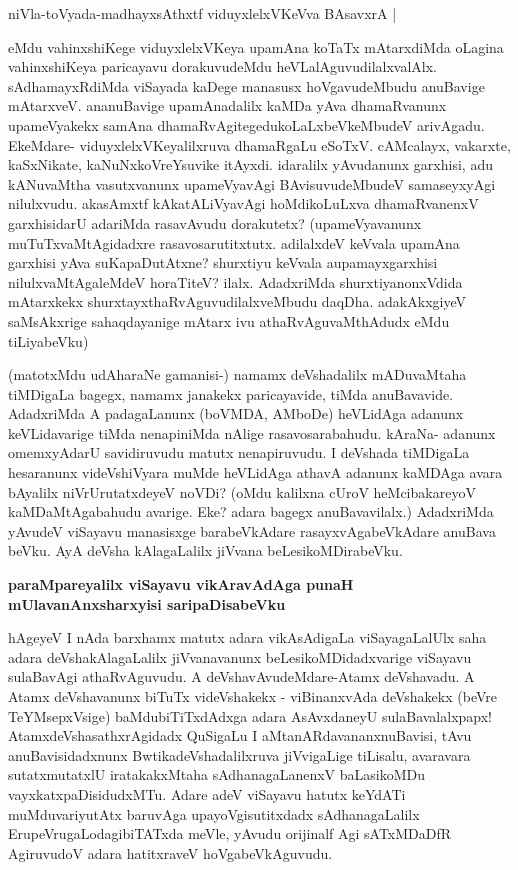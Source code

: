 \medskip
\begin{shloka}
niVla-toVyada-madhayxsAthxtf viduyxlelxVKeVva BAsavxrA |\label{166}
\end{shloka}
\smallskip

\noindent
eMdu vahinxshiKege viduyxlelxVKeya upamAna koTaTx mAtarxdiMda oLagina vahinx\break\-shiKeya paricayavu dorakuvudeMdu heVLalAguvudilalxvalAlx. sAdhamayxRdiMda viSayada kaDege manasusx hoVgavudeMbudu anuBavige mAtarxveV. ananu\-Bavige upamAnadalilx kaMDa yAva dhamaRvanunx upameVyakekx samAna dhamaRvAgi\break tegedu\-koLaLxbeVkeMbudeV arivAgadu. EkeMdare- viduyxlelxVKeyalilxruva dhamaR\-gaLu eSoTxV.\- cAMcalayx, vakarxte, kaSxNikate, kaNuNxkoVreYsuvike itAyxdi. idaralilx yAvu\-danunx garxhisi, adu kANuvaMtha vasutx\-vanunx upameVyavAgi BAvisuvudeMbudeV samaseyxyAgi nilulxvudu. akasAmxtf kAka\-tALiVya\-vAgi hoMdikoLuLxva dhamaRvanenxV garxhisidarU adariMda rasavAvudu dorakutetx? (upameVyavanunx muTuTx\-vaMtA\-gidadxre rasa\-vosarutitxtutx. adilalxdeV keVvala upamAna garxhisi yAva suKapaDutAtxne? shurxtiyu keVvala aupamayxgarxhisi nilulxvaMtAgaleMdeV horaTiteV? ilalx. AdadxriMda shurxtiyanonxVdida mAtarxkekx shurxtayxthaR\-vAguvudilalxveMbudu daqDha. adakAkxgiyeV saMsAkxrige sahaqdayanige mAtarx ivu athaRvAgu\-vaMthAdudx eMdu tiLiyabeVku)

\medskip

(matotxMdu udAharaNe gamanisi-) namamx deVshadalilx mADuvaMtaha tiMDigaLa bagegx, namamx janakekx paricayavide, tiMda anuBavavide. AdadxriMda A padagaLanunx (boVMDA, AMboDe) heVLidAga adanunx keVLidavarige tiMda nenapiniMda nAlige rasavosarabahudu. kAraNa- adanunx omemxyAdarU savidiru\-vudu matutx nenapiruvudu. I deVshada tiMDigaLa hesaranunx videVshiVyara muMde heVLidAga athavA adanunx kaMDAga avara bAyalilx niVrUrutatxdeyeV noVDi? (oMdu kalilxna cUroV heMcibakareyoV kaMDaMtAgabahudu avarige. Eke? adara bagegx anuBavavilalx.) AdadxriMda yAvudeV viSayavu mana\-sisxge barabeVkAdare rasayxvAgabeVkAdare anuBava beVku. AyA deVsha kAlagaLalilx jiVvana beLesikoMDirabeVku.

{\bigskip
\noindent
{\large\bf paraMpareyalilx viSayavu vikAravAdAga punaH mUlavanAnxsharxyisi saripaDisa\-beVku}}
\medskip

\noindent
hAgeyeV I nAda barxhamx matutx adara vikAsAdigaLa viSayagaLalUlx saha adara deVshakAlagaLalilx jiVvanavanunx beLesikoMDidadxvarige viSayavu sulaBavAgi athaR\-vAguvudu. A deVshavAvudeMdare-Atamx deVshavadu. A Atamx deVshavanunx biTuTx \hbox{videVshakekx} - viBinanxvAda deVshakekx (beVre TeYMsepxVsige) baMdubiTiTx\-dAdxga adara AsAvxdaneyU sulaBavalalxpapx! AtamxdeVshasathxrAgidadx QuSigaLu I aMtanARdavananxnuBavisi, tAvu anuBavisidadxnunx BwtikadeVshadalilxruva jiVvigaLige tiLisalu, avaravara sutatx\-mutatxlU iratakakxMtaha sAdhana\-gaLanenxV baLasikoMDu vayxkatxpaDisidudxMTu. Adare adeV viSayavu hatutx keYdATi muMduvari\-yutAtx baruvAga upayoVgisutitxdadx sAdhanagaLalilx ErupeVrugaLodagibiTATxda meVle, yAvudu orijinalf Agi sATxMDaDfR Agiru\-vudoV adara hatitxraveV hoVgabeVkAguvudu.

